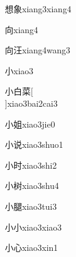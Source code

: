 \begin{verbete}[13;11]{想象}{xiang3xiang4}
\end{verbete}

\begin{verbete}[6]{向}{xiang4}
\end{verbete}

\begin{verbete}[6;7]{向汪}{xiang4wang3}
\end{verbete}

\begin{verbete}[3]{小}{xiao3}
\end{verbete}

\begin{verbete}[3;5;11]{小白菜}[\\]{xiao3bai2cai3}
\end{verbete}

\begin{verbete}[3;8]{小姐}{xiao3jie0}
\end{verbete}

\begin{verbete}[3;9]{小说}{xiao3shuo1}
\end{verbete}

\begin{verbete}[3;7]{小时}{xiao3shi2}
\end{verbete}

\begin{verbete}[3;9]{小树}{xiao3shu4}
\end{verbete}

\begin{verbete}[3;13]{小腿}{xiao3tui3}
\end{verbete}

\begin{verbete}[3]{小小}{xiao3xiao3}
\end{verbete}

\begin{verbete}[3;4]{小心}{xiao3xin1}
\end{verbete}

